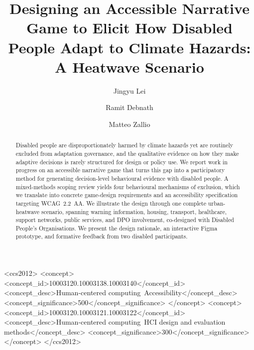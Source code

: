\documentclass[sigconf]{acmart}
\begin{document}
\title{Designing an Accessible Narrative Game to Elicit How Disabled
People Adapt to Climate Hazards: A Heatwave Scenario}

\author{Jingyu Lei}

\author{Ramit Debnath}

\author{Matteo Zallio}

\renewcommand{\shortauthors}{Lei}

\begin{abstract}
Disabled people are disproportionately harmed by climate hazards yet are
routinely excluded from adaptation governance, and the qualitative
evidence on how they make adaptive decisions is rarely structured for
design or policy use. We report work in progress on an accessible
narrative game that turns this gap into a participatory method for
generating decision-level behavioural evidence with disabled people. A
mixed-methods scoping review yields four behavioural mechanisms of
exclusion, which we translate into concrete game-design requirements and
an accessibility specification targeting WCAG~2.2~AA. We illustrate the
design through one complete urban-heatwave scenario, spanning warning
information, housing, transport, healthcare, support networks, public
services, and DPO involvement, co-designed with Disabled People's
Organisations. We present the design rationale, an interactive Figma
prototype, and formative feedback from two disabled participants.
\end{abstract}

\begin{CCSXML}
<ccs2012>
<concept>
<concept_id>10003120.10003138.10003140</concept_id>
<concept_desc>Human-centered computing~Accessibility</concept_desc>
<concept_significance>500</concept_significance>
</concept>
<concept>
<concept_id>10003120.10003121.10003122</concept_id>
<concept_desc>Human-centered computing~HCI design and evaluation methods</concept_desc>
<concept_significance>300</concept_significance>
</concept>
</ccs2012>
\end{CCSXML}

\end{document}
